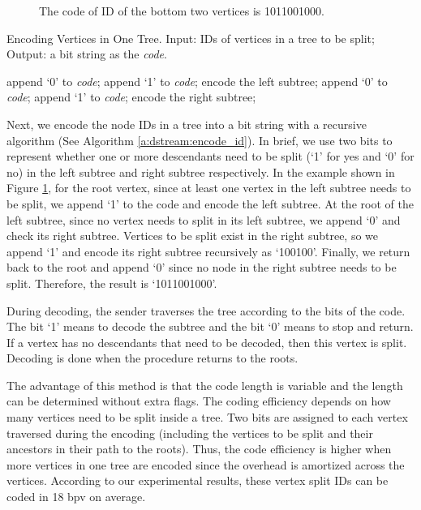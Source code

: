     \begin{figure}
    \centering
    \caption{The code of ID of the bottom two
    vertices is 1011001000. 
    \label{f:dstream:encode_id}}
    \end{figure}
    \begin{algorithm}
    \caption[Encoding Vertices in One Tree.]{Encoding Vertices in One Tree.
    Input: IDs of vertices in a tree to be split;
    Output: a bit string as the \emph{code}.\label{a:dstream:encode_id}}
    \begin{algorithmic}
        \STATE append `0' to \emph{code};
    \ELSE
        \STATE append `1' to \emph{code};
        \STATE encode the left subtree;
    \ENDIF
        \STATE append `0' to \emph{code};
    \ELSE
        \STATE append `1' to \emph{code};
        \STATE encode the right subtree;
    \ENDIF
    \end{algorithmic}
    \end{algorithm}
    Next, we encode the node IDs in a tree into a bit string with 
    a recursive algorithm (See Algorithm \ref{a:dstream:encode_id}).
    In brief, we use two bits to represent whether one or more descendants need
    to be split (`1' for yes and `0' for no)
    in the left subtree and right subtree respectively. 
    In the example shown in Figure \ref{f:dstream:encode_id}, for the root vertex, since at least one vertex
    in the left subtree needs to be split, we append `1' to the code and encode the
    left subtree. At the root of the left subtree, since no vertex needs to split in its left
    subtree, we append `0' and check its right subtree. Vertices to be split exist in the right
    subtree, so we append `1' and encode its right subtree recursively as `100100'. 
    Finally, we return back to the root and append `0' since 
    no node in the right subtree needs to be split. 
    Therefore, the result is `1011001000'.
        
    During decoding, the sender traverses the tree according to the bits of the code. 
    The bit `1' means to decode the subtree and the bit `0' means to stop and return.
    If a vertex has no descendants that need to be decoded, then this vertex is split. 
    Decoding is done when the procedure returns to the roots.
    
    The advantage of this method is that the code length is variable and the 
    length can be determined without extra flags. The coding efficiency depends
    on how many vertices need to be split inside a tree. Two bits
    are assigned to each vertex traversed during the encoding
    (including the vertices to be split and their ancestors in their path
    to the roots). Thus, the code efficiency is higher when more vertices in one tree
    are encoded since the overhead is amortized across the vertices. 
    According to our experimental results, these vertex split IDs can 
    be coded in 18 bpv on average. 

